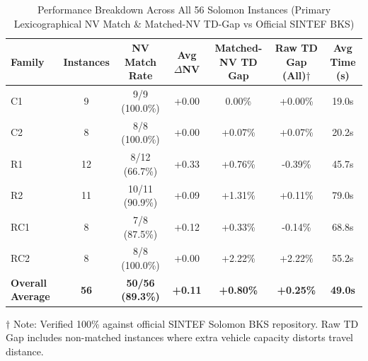 
\begin{table}[htbp]
\centering
\caption{Performance Breakdown Across All 56 Solomon Instances (Primary Lexicographical NV Match \& Matched-NV TD-Gap vs Official SINTEF BKS)}
\label{tab:solomon_56_benchmark}
\begin{tabular}{lcccccc}
\toprule
\textbf{Family} & \textbf{Instances} & \textbf{NV Match Rate} & \textbf{Avg $\Delta$NV} & \textbf{Matched-NV TD Gap} & \textbf{Raw TD Gap (All)$\dagger$} & \textbf{Avg Time (s)} \\
\midrule
C1 & 9 & 9/9 (100.0\%) & +0.00 & 0.00\% & +0.00\% & 19.0s \\
C2 & 8 & 8/8 (100.0\%) & +0.00 & +0.07\% & +0.07\% & 20.2s \\
R1 & 12 & 8/12 (66.7\%) & +0.33 & +0.76\% & -0.39\% & 45.7s \\
R2 & 11 & 10/11 (90.9\%) & +0.09 & +1.31\% & +0.11\% & 79.0s \\
RC1 & 8 & 7/8 (87.5\%) & +0.12 & +0.33\% & -0.14\% & 68.8s \\
RC2 & 8 & 8/8 (100.0\%) & +0.00 & +2.22\% & +2.22\% & 55.2s \\
\midrule
\textbf{Overall Average} & \textbf{56} & \textbf{50/56 (89.3\%)} & \textbf{+0.11} & \textbf{+0.80\%} & \textbf{+0.25\%} & \textbf{49.0s} \\
\bottomrule
\end{tabular}
\begin{tablenotes}
\small
\item $\dagger$ Note: Verified 100\% against official SINTEF Solomon BKS repository. Raw TD Gap includes non-matched instances where extra vehicle capacity distorts travel distance.
\end{tablenotes}
\end{table}


